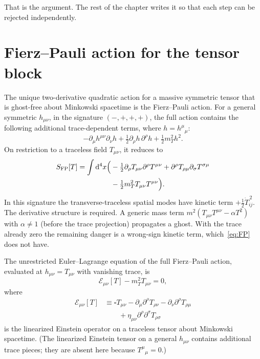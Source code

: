 That is the argument. The rest of the chapter writes it so that each
step can be rejected independently.

\section{Fierz--Pauli action for the tensor block}
\label{sec:ch7-FP}

The unique two-derivative quadratic action for a massive symmetric
tensor that is ghost-free about Minkowski spacetime is the
Fierz--Pauli action. For a general symmetric \(h_{\mu\nu}\), in the
signature \((-,+,+,+)\), the full action contains the following
additional trace-dependent terms, where \(h=h^\mu{}_\mu\):
\[
  -\partial_\mu h^{\mu\nu}\partial_\nu h
  +\tfrac12\partial_\rho h\,\partial^\rho h
  +\tfrac12m_T^2h^2.
\]
On restriction to a traceless field \(T_{\mu\nu}\), it reduces to
\begin{equation}
  \label{eq:FP}
  \begin{aligned}
    S_{\mathrm{FP}}[T]
    =\int\mathrm{d}^4x
     \Bigl(
       &-\tfrac12\partial_\rho T_{\mu\nu}\partial^\rho T^{\mu\nu}
        +\partial^\rho T_{\rho\mu}\partial_\sigma T^{\sigma\mu}\\
       &-\tfrac12 m_T^2 T_{\mu\nu}T^{\mu\nu}
     \Bigr).
  \end{aligned}
\end{equation}
In this signature the transverse-traceless spatial modes have kinetic
term \(+\tfrac12\dot T_{ij}^{\,2}\).
The derivative structure is required. A generic mass term
\(m^2(T_{\mu\nu}T^{\mu\nu}-\alpha T^2)\) with \(\alpha\neq 1\)
(before the trace projection) propagates a ghost. With the trace
already zero the remaining danger is a wrong-sign kinetic term,
which~\eqref{eq:FP} does not have.

The unrestricted Euler--Lagrange equation of the full
Fierz--Pauli action, evaluated at \(h_{\mu\nu}=T_{\mu\nu}\) with
vanishing trace, is
\begin{equation}
  \label{eq:FP-eom}
  \mathcal{E}_{\mu\nu}[T]-m_T^2 T_{\mu\nu}=0,
\end{equation}
where
\begin{equation}
  \label{eq:einstein-op}
  \begin{aligned}
    \mathcal{E}_{\mu\nu}[T]
    &\equiv
    \square T_{\mu\nu}
    -\partial_\mu\partial^\rho T_{\rho\nu}
    -\partial_\nu\partial^\rho T_{\rho\mu}\\
    &\qquad
    +\eta_{\mu\nu}\partial^\rho\partial^\sigma T_{\rho\sigma}
  \end{aligned}
\end{equation}
is the linearized Einstein operator on a traceless tensor about
Minkowski spacetime. (The linearized Einstein tensor on a general
\(h_{\mu\nu}\) contains additional trace pieces; they are absent
here because \(T^\mu{}_\mu=0\).)

